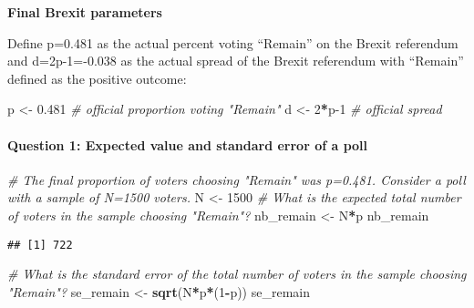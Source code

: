\documentclass[
]{article}
\newenvironment{Shaded}{\begin{snugshade}}{\end{snugshade}}
\newcommand{\CommentTok}[1]{\textcolor[rgb]{0.56,0.35,0.01}{\textit{#1}}}
\newcommand{\DecValTok}[1]{\textcolor[rgb]{0.00,0.00,0.81}{#1}}
\newcommand{\FloatTok}[1]{\textcolor[rgb]{0.00,0.00,0.81}{#1}}
\newcommand{\KeywordTok}[1]{\textcolor[rgb]{0.13,0.29,0.53}{\textbf{#1}}}
\newcommand{\NormalTok}[1]{#1}
\newcommand{\OperatorTok}[1]{\textcolor[rgb]{0.81,0.36,0.00}{\textbf{#1}}}
\newcommand{\StringTok}[1]{\textcolor[rgb]{0.31,0.60,0.02}{#1}}
\begin{document}
\textbf{Final Brexit parameters}

Define p=0.481 as the actual percent voting ``Remain'' on the Brexit
referendum and d=2p-1=-0.038 as the actual spread of the Brexit
referendum with ``Remain'' defined as the positive outcome:

\begin{Shaded}
\begin{Highlighting}[]
\NormalTok{p \textless{}{-}}\StringTok{ }\FloatTok{0.481}    \CommentTok{\# official proportion voting "Remain"}
\NormalTok{d \textless{}{-}}\StringTok{ }\DecValTok{2}\OperatorTok{*}\NormalTok{p}\DecValTok{{-}1}    \CommentTok{\# official spread}
\end{Highlighting}
\end{Shaded}

\hypertarget{question-1-expected-value-and-standard-error-of-a-poll}{%
\paragraph{Question 1: Expected value and standard error of a
poll}\label{question-1-expected-value-and-standard-error-of-a-poll}}

\begin{Shaded}
\begin{Highlighting}[]
\CommentTok{\# The final proportion of voters choosing "Remain" was p=0.481. Consider a poll with a sample of N=1500 voters.}
\NormalTok{N \textless{}{-}}\StringTok{ }\DecValTok{1500}
\CommentTok{\# What is the expected total number of voters in the sample choosing "Remain"?}
\NormalTok{nb\_remain \textless{}{-}}\StringTok{ }\NormalTok{N}\OperatorTok{*}\NormalTok{p}
\NormalTok{nb\_remain}
\end{Highlighting}
\end{Shaded}

\begin{verbatim}
## [1] 722
\end{verbatim}

\begin{Shaded}
\begin{Highlighting}[]
\CommentTok{\# What is the standard error of the total number of voters in the sample choosing "Remain"?}
\NormalTok{se\_remain \textless{}{-}}\StringTok{ }\KeywordTok{sqrt}\NormalTok{(N}\OperatorTok{*}\NormalTok{p}\OperatorTok{*}\NormalTok{(}\DecValTok{1}\OperatorTok{{-}}\NormalTok{p))}
\NormalTok{se\_remain}
\end{Highlighting}
\end{Shaded}
\end{document}
